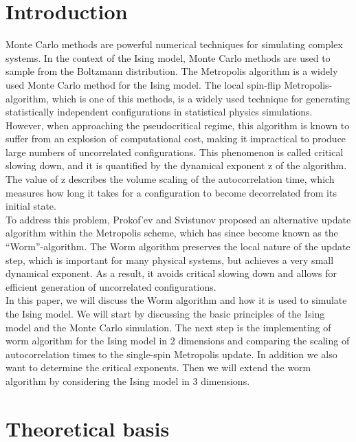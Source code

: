 \documentclass[%
reprint,
 amsmath,amssymb,
 aps,
]{revtex4-2}
\begin{document}
\section{Introduction} 
Monte Carlo methods are powerful numerical techniques for simulating complex systems. In the context of the Ising model, Monte Carlo methods are used to sample from the Boltzmann distribution. The Metropolis algorithm is a widely used Monte Carlo method for the Ising model. The local spin-flip Metropolis-algorithm, which is one of this methods, is a widely used technique for generating statistically independent configurations in statistical physics simulations. \\
However, when approaching the pseudocritical regime, this algorithm is known to suffer from an explosion of computational cost, making it impractical to produce large numbers of uncorrelated configurations. This phenomenon is called critical slowing down, and it is quantified by the dynamical exponent z of the algorithm. The value of z describes the volume scaling of the autocorrelation time, which measures how long it takes for a configuration to become decorrelated from its initial state. \\
To address this problem, Prokof’ev and Svistunov proposed an alternative update algorithm within the Metropolis scheme, which has since become known as the “Worm”-algorithm. The Worm algorithm preserves the local nature of the update step, which is important for many physical systems, but achieves a very small dynamical exponent. As a result, it avoids critical slowing down and allows for efficient generation of uncorrelated configurations. \\
In this paper, we will discuss the Worm algorithm and how it is used to simulate the Ising model. We will start by discussing the basic principles of the Ising model and the Monte Carlo simulation. The next step is the implementing of worm algorithm for the Ising model in 2 dimensions and comparing the scaling of autocorrelation times to the single-spin Metropolis update. In addition we also want to determine the critical exponents. Then we will extend the worm algorithm by considering the Ising model in 3 dimensions.    


\section{Theoretical basis}
\end{document}
